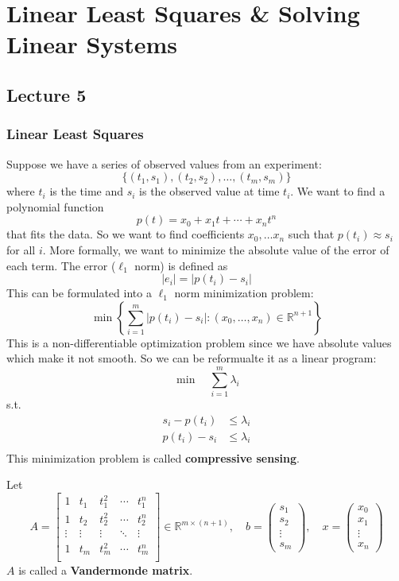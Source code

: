 \newpage
\section{Linear Least Squares \& Solving Linear Systems}
\subsection{Lecture 5}
\subsubsection{Linear Least Squares}
\begin{problem}
  Suppose we have a series of observed values from an experiment:
  $$\{(t_1, s_1), (t_2, s_2),\ldots, (t_m,s_m)\}$$ where $t_i$ is the time and $s_i$ is the observed value at time $t_i$. We want to find a polynomial function $$p(t) = x_0 + x_1t + \cdots + x_nt^n$$ that fits the data. So we want to find coefficients $x_0,\ldots x_n$ such that $p(t_i) \approx s_i$ for all $i$. More formally, we want to minimize the absolute value of the error of each term. The error ($\ell_1$ norm) is defined as $$|e_i| = |p(t_i) - s_i|$$ This can be formulated into a $\ell_1$ norm minimization problem:$$\min \left\{\sum^m_{i=1}|p(t_i) - s_i| : (x_0,\ldots,x_n) \in \mathbb R^{n+1}\right\}$$ This is a non-differentiable optimization problem since we have absolute values which make it not smooth. So we can be reformualte it as a linear program:
  $$\min \quad \sum^m_{i=1}\lambda_i$$
  s.t.
  \begin{align*}
    s_i - p(t_i) &\leq \lambda_i \tag*{for all $i = 1,\ldots,m$}\\
    p(t_i) - s_i &\leq \lambda_i \tag*{for all $i = 1,\ldots,m$}\\
  \end{align*}
  This minimization problem is called \textbf{compressive sensing}.
\end{problem}
\begin{definition}
  Let $$A = \begin{bmatrix}
    1 & t_1 & t_1^2 & \cdots & t_1^n\\
    1 & t_2 & t_2^2 & \cdots & t_2^n\\
    \vdots & \vdots & \vdots & \ddots & \vdots\\
    1 & t_m & t_m^2 & \cdots & t_m^n\\
  \end{bmatrix} \in \mathbb R^{m \times (n+1)}, \quad b = \begin{pmatrix}
    s_1 \\ s_2 \\ \vdots \\ s_m
  \end{pmatrix}, \quad x = \begin{pmatrix}
    x_0 \\ x_1 \\ \vdots \\ x_n
  \end{pmatrix}$$
  $A$ is called a \textbf{Vandermonde matrix}.
\end{definition}
